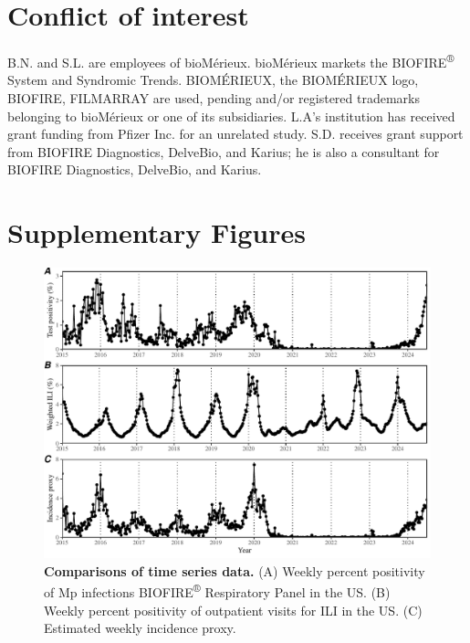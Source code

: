 \documentclass[12pt]{article}
\begin{document}
\section*{Conflict of interest}

B.N. and S.L. are employees of bioMérieux.
bioMérieux markets the BIOFIRE\textsuperscript{®} System and Syndromic Trends. 
BIOMÉRIEUX, the BIOMÉRIEUX logo, BIOFIRE, FILMARRAY are used, pending and/or registered trademarks belonging to bioMérieux or one of its subsidiaries.
L.A's institution has received grant funding from Pfizer Inc. for an unrelated study.
S.D. receives grant support from BIOFIRE Diagnostics, DelveBio, and Karius; he is also a consultant for BIOFIRE Diagnostics, DelveBio, and Karius.

\pagebreak

\setcounter{figure}{0}
\setcounter{equation}{0}
\renewcommand{\thefigure}{S\arabic{figure}}
\renewcommand{\theequation}{S\arabic{equation}}

\section*{Supplementary Figures}

\begin{figure}[!ht]
\includegraphics[width=\textwidth]{../figure_timeseries/figure_timeseries.pdf}
\caption{
\textbf{Comparisons of time series data.}
(A) Weekly percent positivity of Mp infections BIOFIRE\textsuperscript{®} Respiratory Panel in the US.
(B) Weekly percent positivity of outpatient visits for ILI in the US.
(C) Estimated weekly incidence proxy.
}
\end{figure}
\end{document}

